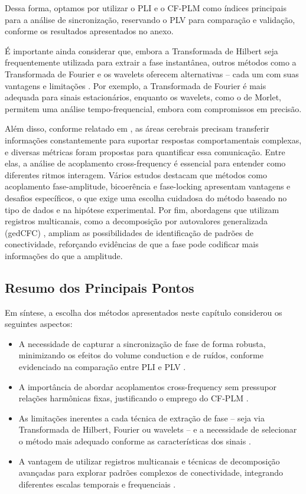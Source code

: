 Dessa forma, optamos por utilizar o PLI e o CF-PLM como índices principais para a análise de sincronização, reservando o PLV para comparação e validação, conforme os resultados apresentados no anexo.

É importante ainda considerar que, embora a Transformada de Hilbert seja frequentemente utilizada para extrair a fase instantânea, outros métodos como a Transformada de Fourier e os wavelets oferecem alternativas – cada um com suas vantagens e limitações \cite{seraj2018cerebral}. Por exemplo, a Transformada de Fourier é mais adequada para sinais estacionários, enquanto os wavelets, como o de Morlet, permitem uma análise tempo-frequencial, embora com compromissos em precisão.

Além disso, conforme relatado em \cite{sorrentino2022detection}, as áreas cerebrais precisam transferir informações constantemente para suportar respostas comportamentais complexas, e diversas métricas foram propostas para quantificar essa comunicação. Entre elas, a análise de acoplamento cross-frequency é essencial para entender como diferentes ritmos interagem. Vários estudos \cite{hulsemann2019quantification} destacam que métodos como acoplamento fase-amplitude, bicoerência e fase-locking apresentam vantagens e desafios específicos, o que exige uma escolha cuidadosa do método baseado no tipo de dados e na hipótese experimental. Por fim, abordagens que utilizam registros multicanais, como a decomposição por autovalores generalizada (gedCFC) \cite{cohen2017where}, ampliam as possibilidades de identificação de padrões de conectividade, reforçando evidências de que a fase pode codificar mais informações do que a amplitude.

\subsection{Resumo dos Principais Pontos}

Em síntese, a escolha dos métodos apresentados neste capítulo considerou os seguintes aspectos:

\begin{itemize}
  \item A necessidade de capturar a sincronização de fase de forma robusta, minimizando os efeitos do volume conduction e de ruídos, conforme evidenciado na comparação entre PLI e PLV \cite{seraj2018cerebral, zhang2014phase}.
  \item A importância de abordar acoplamentos cross-frequency sem pressupor relações harmônicas fixas, justificando o emprego do CF-PLM \cite{sorrentino2022detection, seraj2018cerebral, cohen2017multivariate}.
  \item As limitações inerentes a cada técnica de extração de fase – seja via Transformada de Hilbert, Fourier ou wavelets – e a necessidade de selecionar o método mais adequado conforme as características dos sinais \cite{seraj2018cerebral}.
  \item A vantagem de utilizar registros multicanais e técnicas de decomposição avançadas para explorar padrões complexos de conectividade, integrando diferentes escalas temporais e frequenciais \cite{cohen2017multivariate}.
\end{itemize}

